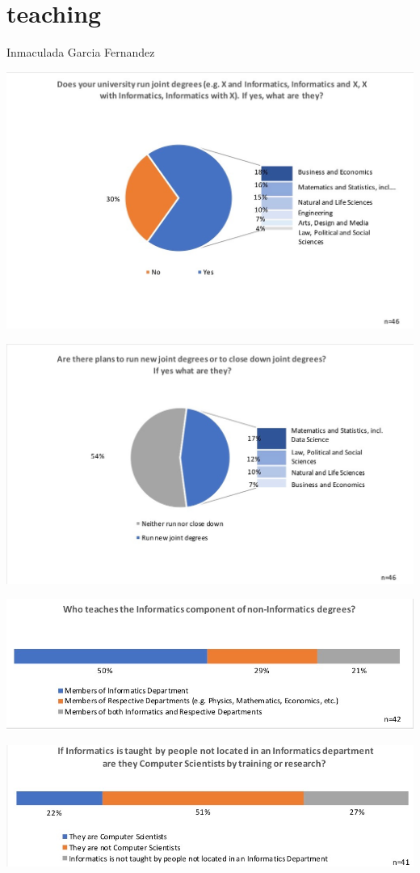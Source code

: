 \section{teaching}

Inmaculada Garcia Fernandez

\includegraphics[width = \linewidth]{charts/2a.jpg}

\includegraphics[width = \linewidth]{charts/2b.jpg}

\includegraphics[width = \linewidth]{charts/2c.jpg}

\includegraphics[width = \linewidth]{charts/2d.jpg}
